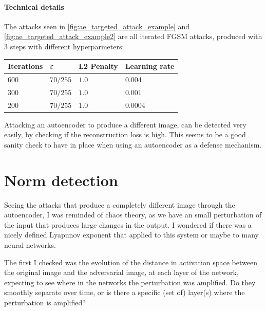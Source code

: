 \documentclass[]{scrarticle}
\begin{document}
\paragraph{Technical details}
The attacks seen in \autoref{fig:ae_targeted_attack_example} and
\ref{fig:ae_targeted_attack_example2}
 are all iterated FGSM attacks,
produced with 3 steps with different hyperparmeters:
\begin{center}
  \begin{tabular}{llll}
    Iterations & $\varepsilon$ & L2 Penalty & Learning rate \\
    \hline
    600 & $70 / 255$ & $1.0$ & $0.004$ \\
    300 & $70 / 255$ & $1.0$ & $0.001$ \\
    200 & $70 / 255$ & $1.0$ & $0.0004$ \\
  \end{tabular}
\end{center}


\begin{remark}
  Attacking an autoencoder to produce a different image, can be detected
  very easily, by checking if the reconstruction loss is high.
  This seems to be a good sanity check to have in place when using
  an autoencoder as a defense mechanism.
\end{remark}

\section{Norm detection}

Seeing the attacks that produce a completely different image
through the autoencoder, I was reminded of chaos theory,
as we have an small perturbation of the input that produces
large changes in the output.
I wondered if there was a nicely defined Lyapunov exponent
that applied to this system or maybe to many neural networks.

The first I checked was the evolution of the distance in
activation space between the original image and the adversarial image,
at each layer of the network, expecting to see where in
the networks the perturbation was amplified. Do they smoothly
separate over time, or is there a specific (set of) layer(s)
where the perturbation is amplified?
\end{document}

